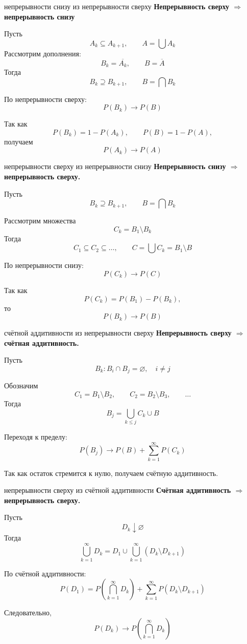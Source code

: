 \documentclass[12pt,a4paper]{article}
\begin{document}
\begin{proofbox}{непрерывности снизу из непрерывности сверху}
\textbf{Непрерывность сверху $\Rightarrow$ непрерывность снизу}

Пусть
\[
A_k\subseteq A_{k+1},\qquad A=\bigcup A_k
\]
Рассмотрим дополнения:
\[
B_k=\overline{A_k},\qquad B=\overline{A}
\]
Тогда
\[
B_k\supseteq B_{k+1},\qquad B=\bigcap B_k
\]

По непрерывности сверху:
\[
P(B_k)\to P(B)
\]

Так как
\[
P(B_k)=1-P(A_k),\qquad P(B)=1-P(A),
\]
получаем
\[
P(A_k)\to P(A)
\]
\end{proofbox}

\begin{proofbox}{непрерывности сверху из непрерывности снизу}
\textbf{Непрерывность снизу $\Rightarrow$ непрерывность сверху.}

Пусть
\[
B_k\supseteq B_{k+1},\qquad B=\bigcap B_k
\]

Рассмотрим множества
\[
C_k=B_1\setminus B_k
\]
Тогда
\[
C_1\subseteq C_2\subseteq\dots,
\qquad
C=\bigcup C_k=B_1\setminus B
\]

По непрерывности снизу:
\[
P(C_k)\to P(C)
\]

Так как
\[
P(C_k)=P(B_1)-P(B_k),
\]
то
\[
P(B_k)\to P(B)
\]
\end{proofbox}


\begin{proofbox}{счётной аддитивности из непрерывности сверху}
\textbf{Непрерывность сверху $\Rightarrow$ счётная аддитивность.}

Пусть
\[
B_k:B_i\cap B_j=\varnothing,\quad i\neq j
\]

Обозначим
\[
C_1=B_1\setminus B_2,\qquad
C_2=B_2\setminus B_3,\qquad
\dots
\]
Тогда
\[
B_j=\bigcup_{k\leq j}C_k\cup B
\]

Переходя к пределу:
\[
P(B_j)\to P(B)+\sum_{k=1}^{\infty}P(C_k)
\]

Так как остаток стремится к нулю, получаем счётную аддитивность.
\end{proofbox}


\begin{proofbox}{непрерывности сверху из счётной аддитивности}
\textbf{Счётная аддитивность $\Rightarrow$ непрерывность сверху.}

Пусть
\[
D_k\downarrow\varnothing
\]
Тогда
\[
\bigcup_{k=1}^{\infty}D_k
=
D_1\cup\bigcup_{k=1}^{\infty}(D_k\setminus D_{k+1})
\]

По счётной аддитивности:
\[
P(D_1)=P\left(\bigcap_{k=1}^{\infty}D_k\right)
+
\sum_{k=1}^{\infty}P(D_k\setminus D_{k+1})
\]

Следовательно,
\[
P(D_k)\to P\left(\bigcap_{k=1}^{\infty}D_k\right)
\]
\end{proofbox}
\end{document}
